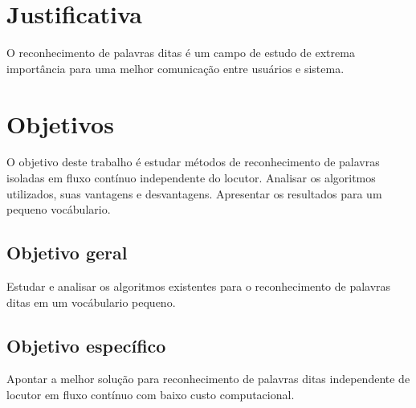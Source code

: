 \section{Justificativa}
\label{sec:justificativa}



O reconhecimento de palavras ditas é um campo de estudo de extrema importância para uma melhor comunicação entre usuários e sistema.
\section{Objetivos}
\label{sec:objetivos}

O objetivo deste trabalho é estudar métodos de reconhecimento de palavras isoladas em fluxo contínuo independente do locutor. Analisar os algoritmos utilizados, suas vantagens e desvantagens. Apresentar os resultados para um pequeno vocábulario.
\subsection{Objetivo geral}
\label{subsec:objetivogeral}
Estudar e analisar os algoritmos existentes para o reconhecimento de palavras  ditas em um vocábulario pequeno.
\subsection{Objetivo específico}
\label{subsec:objetivoespecifico}
Apontar a melhor solução para reconhecimento de palavras ditas independente de locutor em fluxo contínuo com baixo custo computacional.


